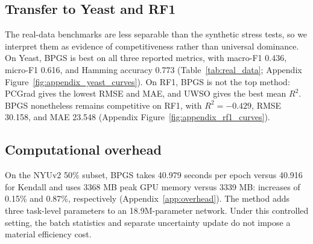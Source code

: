 \subsection{Transfer to Yeast and RF1}
The real-data benchmarks are less separable than the synthetic stress tests, so we interpret them as evidence of competitiveness rather than universal dominance. On Yeast, BPGS is best on all three reported metrics, with macro-F1 0.436, micro-F1 0.616, and Hamming accuracy 0.773 (Table~\ref{tab:real_data}; Appendix Figure~\ref{fig:appendix_yeast_curves}). On RF1, BPGS is not the top method: PCGrad gives the lowest RMSE and MAE, and UWSO gives the best mean $R^2$. BPGS nonetheless remains competitive on RF1, with $R^2=-0.429$, RMSE 30.158, and MAE 23.548 (Appendix Figure~\ref{fig:appendix_rf1_curves}).



\subsection{Computational overhead}
On the NYUv2 50\% subset, BPGS takes 40.979 seconds per epoch versus 40.916 for Kendall and uses
3368 MB peak GPU memory versus 3339 MB: increases of 0.15\% and 0.87\%, respectively
(Appendix~\ref{app:overhead}). The method adds three task-level parameters to an
18.9M-parameter network. Under this controlled setting, the batch statistics and separate
uncertainty update do not impose a material efficiency cost.
